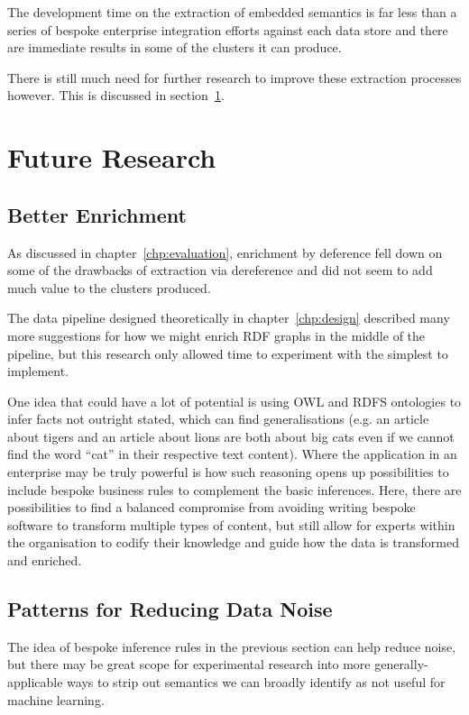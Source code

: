 The development time on the extraction of embedded semantics is
far less than a series of bespoke enterprise integration efforts
against each data store and there are immediate results in some
of the clusters it can produce.

There is still much need for further research to improve these
extraction processes however. This is discussed in section~\ref{sec:con-future}.

\section{Future Research}
\label{sec:con-future}
\subsection{Better Enrichment}

As discussed in chapter~\ref{chp:evaluation}, enrichment by
deference fell down on some of the drawbacks of extraction via
dereference and did not seem to add much value to the clusters
produced.

The data pipeline designed theoretically in chapter~\ref{chp:design}
described many more suggestions for how we might enrich RDF graphs
in the middle of the pipeline, but this research only allowed time
to experiment with the simplest to implement.

One idea that could have a lot of potential is using OWL and RDFS
ontologies to infer facts not outright stated, which can find
generalisations (e.g. an article about tigers and an article about
lions are both about big cats even if we cannot find the word ``cat''
in their respective text content). Where the application in an
enterprise may be truly powerful is how such reasoning opens up
possibilities to include bespoke business rules to complement the
basic inferences. Here, there are possibilities to find a
balanced compromise from avoiding writing bespoke software to
transform multiple types of content, but still allow for experts
within the organisation to codify their knowledge and guide how the
data is transformed and enriched.

\subsection{Patterns for Reducing Data Noise}

The idea of bespoke inference rules in the previous section can help
reduce noise, but there may be great scope for experimental research
into more generally-applicable ways to strip out semantics we can
broadly identify as not useful for machine learning.

